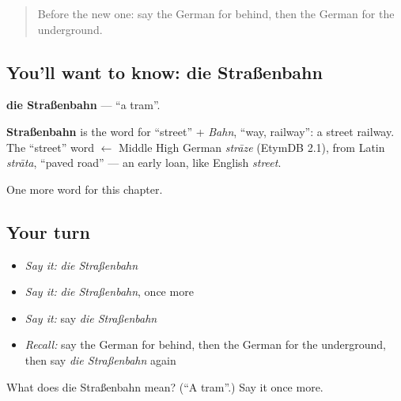 \label{lesson:GE-C110-strassenbahn}



\begin{quote}
Before the new one: say the German for behind, then the German for the underground.
\end{quote}

\subsection*{You'll want to know: die Straßenbahn}
\textbf{die Straßenbahn} — \textquotedblleft{}a tram\textquotedblright{}.

\begin{cousinweb}
\textbf{Straßenbahn} is the word for \textquotedblleft{}street\textquotedblright{} + \emph{Bahn}, \textquotedblleft{}way, railway\textquotedblright{}: a street railway. The \textquotedblleft{}street\textquotedblright{} word $\leftarrow$ Middle High German \emph{strāze} (EtymDB 2.1), from Latin \emph{strāta}, \textquotedblleft{}paved road\textquotedblright{} — an early loan, like English \emph{street}.
\end{cousinweb}

\begin{grammarlens}[title={What you've built}]
One more word for this chapter.
\end{grammarlens}

\subsection*{Your turn}
\begin{itemize}
\raggedright
  \item \emph{Say it:} \emph{die Straßenbahn}
  \item \emph{Say it:} \emph{die Straßenbahn}, once more
  \item \emph{Say it:} say \emph{die Straßenbahn}
  \item \emph{Recall:} say the German for behind, then the German for the underground, then say \emph{die Straßenbahn} again
\end{itemize}

\begin{tcolorbox}[breakable,colback=teal!4,colframe=teal!35!black,title={Before you move on}]
What does die Straßenbahn mean? (\textquotedblleft{}A tram\textquotedblright{}.) Say it once more.
\end{tcolorbox}
